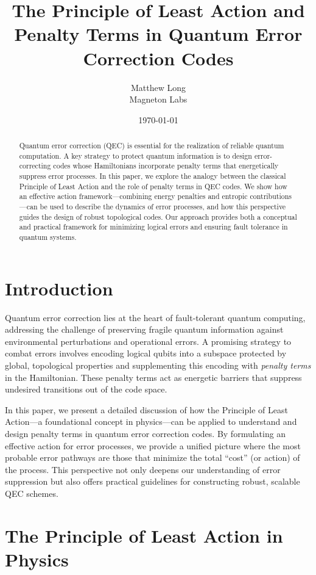 \documentclass[12pt]{article}
\title{\bf The Principle of Least Action and Penalty Terms in Quantum Error Correction Codes}
\author{Matthew Long \\
Magneton Labs}
\date{\today}
\begin{document}
\maketitle

\begin{abstract}
Quantum error correction (QEC) is essential for the realization of reliable quantum computation. A key strategy to protect quantum information is to design error-correcting codes whose Hamiltonians incorporate penalty terms that energetically suppress error processes. In this paper, we explore the analogy between the classical Principle of Least Action and the role of penalty terms in QEC codes. We show how an effective action framework—combining energy penalties and entropic contributions—can be used to describe the dynamics of error processes, and how this perspective guides the design of robust topological codes. Our approach provides both a conceptual and practical framework for minimizing logical errors and ensuring fault tolerance in quantum systems.
\end{abstract}

\tableofcontents

\newpage

\section{Introduction}
Quantum error correction lies at the heart of fault-tolerant quantum computing, addressing the challenge of preserving fragile quantum information against environmental perturbations and operational errors. A promising strategy to combat errors involves encoding logical qubits into a subspace protected by global, topological properties and supplementing this encoding with \emph{penalty terms} in the Hamiltonian. These penalty terms act as energetic barriers that suppress undesired transitions out of the code space.

In this paper, we present a detailed discussion of how the Principle of Least Action—a foundational concept in physics—can be applied to understand and design penalty terms in quantum error correction codes. By formulating an effective action for error processes, we provide a unified picture where the most probable error pathways are those that minimize the total ``cost'' (or action) of the process. This perspective not only deepens our understanding of error suppression but also offers practical guidelines for constructing robust, scalable QEC schemes.

\section{The Principle of Least Action in Physics}
\end{document}
